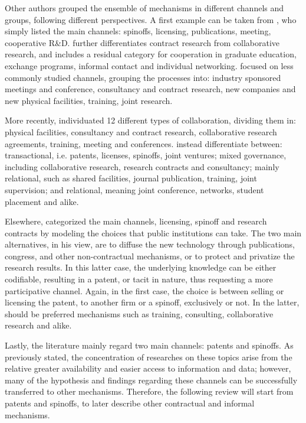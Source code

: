Other authors grouped the ensemble of mechanisms in different channels and groups, following different perspectives. A first example can be taken from 	\citet{Rogers2001}, who simply listed the main channels: spinoffs, licensing, publications, meeting, cooperative R\&D. \citet{Debackere2005} further differentiates contract research from collaborative research, and includes a residual category for cooperation in graduate education, exchange programs, informal contact and individual networking. \citet{DEste2007} focused on less commonly studied channels, grouping the processes into: industry sponsored meetings and conference, consultancy and contract research, new companies and new physical facilities, training, joint research. 

More recently, \citet{Muscio2013} individuated 12 different types of collaboration, dividing them in: physical facilities, consultancy and contract research, collaborative research agreements, training, meeting and conferences. \citet{Alexander2013} instead differentiate between: transactional, i.e. patents, licenses, spinoffs, joint ventures; mixed governance, including collaborative research, research contracts and consultancy; mainly relational, such as shared facilities, journal publication, training, joint supervision; and relational, meaning joint conference, networks, student placement and alike.

Elsewhere, \citet{Balderi2010} categorized the main channels, licensing, spinoff and research contracts by modeling the choices that public institutions can take. The two main alternatives, in his view, are to diffuse the new technology through publications, congress, and other non-contractual mechanisms, or to protect and privatize the research results. In this latter case, the underlying knowledge can be either codifiable, resulting in a patent, or tacit in nature, thus requesting a more participative channel. Again, in the first case, the choice is between selling or licensing the patent, to another firm or a spinoff, exclusively or not. In the latter, should be preferred mechanisms such as training, consulting, collaborative research and alike. 

Lastly, the literature mainly regard two main channels: patents and spinoffs. As previously stated, the concentration of researches on these topics arise from the relative greater availability and easier access to information and data; however, many of the hypothesis and findings regarding these channels can be successfully transferred to other mechanisms. Therefore, the following review will start from patents and spinoffs, to later describe other contractual and informal mechanisms. 


